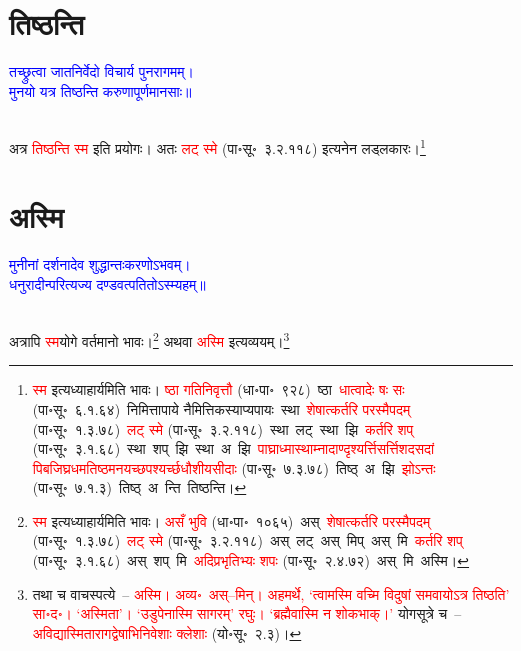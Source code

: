\section[तिष्ठन्ति]{तिष्ठन्ति}
\centering\textcolor{blue}{तच्छ्रुत्वा जातनिर्वेदो विचार्य पुनरागमम्।\nopagebreak\\
मुनयो यत्र तिष्ठन्ति करुणापूर्णमानसाः॥}\nopagebreak\\
\\
\fontsize{14}{21}\selectfont\begin{sloppypar}\justifying\noindent\hspace{10mm} अत्र \textcolor{red}{तिष्ठन्ति स्म} इति प्रयोगः। अतः \textcolor{red}{लट् स्मे} (पा॰सू॰~३.२.११८) इत्यनेन लड्लकारः।\footnote{\textcolor{red}{स्म} इत्यध्याहार्यमिति भावः। \textcolor{red}{ष्ठा गतिनिवृत्तौ} (धा॰पा॰~९२८)~\arrow ष्ठा~\arrow \textcolor{red}{धात्वादेः षः सः} (पा॰सू॰~६.१.६४)~\arrow निमित्तापाये नैमित्तिकस्याप्यपायः~\arrow स्था~\arrow \textcolor{red}{शेषात्कर्तरि परस्मैपदम्} (पा॰सू॰~१.३.७८)~\arrow \textcolor{red}{लट् स्मे} (पा॰सू॰~३.२.११८)~\arrow स्था~लट्~\arrow स्था~झि~\arrow \textcolor{red}{कर्तरि शप्‌} (पा॰सू॰~३.१.६८)~\arrow स्था~शप्~झि~\arrow स्था~अ~झि~\arrow \textcolor{red}{पाघ्रा\-ध्मास्थाम्ना\-दाण्दृश्यर्त्ति\-सर्त्तिशदसदां पिब\-जिघ्र\-धम\-तिष्ठ\-मन\-यच्छ\-पश्यर्च्छ\-धौ\-शीय\-सीदाः} (पा॰सू॰~७.३.७८)~\arrow तिष्ठ्~अ~झि~\arrow \textcolor{red}{झोऽन्तः} (पा॰सू॰~७.१.३)~\arrow तिष्ठ्~अ~न्ति~\arrow तिष्ठन्ति।}\end{sloppypar}
\section[अस्मि]{अस्मि}
\centering\textcolor{blue}{मुनीनां दर्शनादेव शुद्धान्तःकरणोऽभवम्।\nopagebreak\\
धनुरादीन्परित्यज्य दण्डवत्पतितोऽस्म्यहम्॥}\nopagebreak\\
\\
\fontsize{14}{21}\selectfont\begin{sloppypar}\justifying\noindent\hspace{10mm} अत्रापि \textcolor{red}{स्म}\-योगे वर्तमानो भावः।\footnote{\textcolor{red}{स्म} इत्यध्याहार्यमिति भावः। \textcolor{red}{असँ भुवि} (धा॰पा॰~१०६५)~\arrow अस्~\arrow \textcolor{red}{शेषात्कर्तरि परस्मैपदम्} (पा॰सू॰~१.३.७८)~\arrow \textcolor{red}{लट् स्मे} (पा॰सू॰~३.२.११८)~\arrow अस्~लट्~\arrow अस्~मिप्~\arrow अस्~मि~\arrow \textcolor{red}{कर्तरि शप्‌} (पा॰सू॰~३.१.६८)~\arrow अस्~शप्~मि~\arrow \textcolor{red}{अदिप्रभृतिभ्यः शपः} (पा॰सू॰~२.४.७२)~\arrow अस्~मि~\arrow अस्मि।} अथवा \textcolor{red}{अस्मि} इत्यव्ययम्।\footnote{तथा च वाचस्पत्ये~– \textcolor{red}{अस्मि। अव्य॰~अस्–मिन्। अहमर्थे, ‘त्वामस्मि वच्मि विदुषां समवायोऽत्र तिष्ठति’ सा॰द॰। ‘अस्मिता’। ‘उडुपेनास्मि सागरम्’ रघुः। ‘ब्रह्मैवास्मि न शोकभाक्।’} योगसूत्रे च~– \textcolor{red}{अविद्यास्मिता\-रागद्वेषाभि\-निवेशाः क्लेशाः} (यो॰सू॰~२.३)।}\end{sloppypar}
